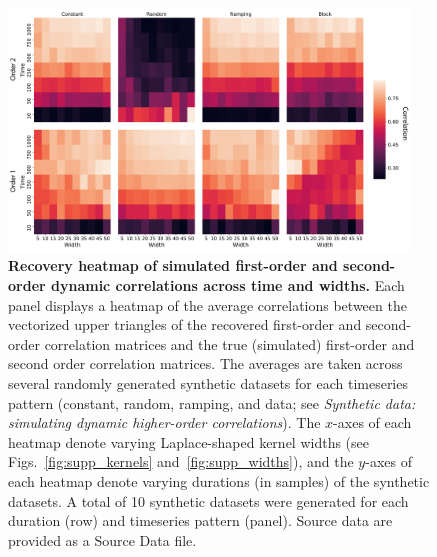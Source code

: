 \documentclass[english]{article}
\begin{document}
\begin{figure}[p!]
\centering
\includegraphics[width=0.95\textwidth]{figs/sim_heatmaps_time}
  \caption{\textbf{Recovery heatmap of simulated first-order and
      second-order dynamic correlations across time and widths.}  Each panel displays a
    heatmap of the average correlations
    between the vectorized upper triangles of the recovered
    first-order and second-order correlation matrices and the true
    (simulated) first-order and second order correlation matrices.
    The averages are taken across several randomly generated
    synthetic datasets for each timeseries pattern (constant, random,
    ramping, and data; see \textit{Synthetic data: simulating dynamic higher-order
      correlations}).  The $x$-axes of each heatmap denote varying
    Laplace-shaped kernel widths (see Figs.~\ref{fig:supp_kernels}
    and~\ref{fig:supp_widths}), and the $y$-axes of each heatmap
    denote varying durations (in samples) of the synthetic datasets.
    A total of 10 synthetic datasets were generated for each duration
    (row) and timeseries pattern (panel).  Source data are provided as a Source Data file.}
\label{fig:time}
\end{figure}
\end{document}
